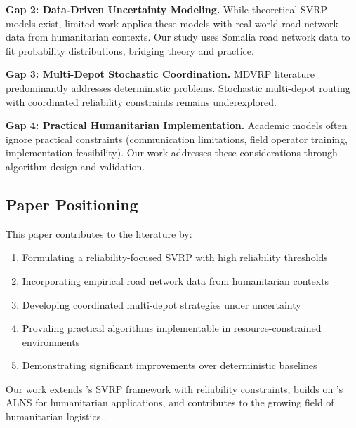 \textbf{Gap 2: Data-Driven Uncertainty Modeling.} While theoretical SVRP models exist, limited work applies these models with real-world road network data from humanitarian contexts. Our study uses Somalia road network data to fit probability distributions, bridging theory and practice.

\textbf{Gap 3: Multi-Depot Stochastic Coordination.} MDVRP literature predominantly addresses deterministic problems. Stochastic multi-depot routing with coordinated reliability constraints remains underexplored.

\textbf{Gap 4: Practical Humanitarian Implementation.} Academic models often ignore practical constraints (communication limitations, field operator training, implementation feasibility). Our work addresses these considerations through algorithm design and validation.

\subsection{Paper Positioning}

This paper contributes to the literature by:
\begin{enumerate}
\item Formulating a reliability-focused SVRP with high reliability thresholds
\item Incorporating empirical road network data from humanitarian contexts
\item Developing coordinated multi-depot strategies under uncertainty
\item Providing practical algorithms implementable in resource-constrained environments
\item Demonstrating significant improvements over deterministic baselines
\end{enumerate}

Our work extends \cite{Gendreau2014}'s SVRP framework with reliability constraints, builds on \cite{Ropke2006}'s ALNS for humanitarian applications, and contributes to the growing field of humanitarian logistics \cite{Kovacs2012}.
